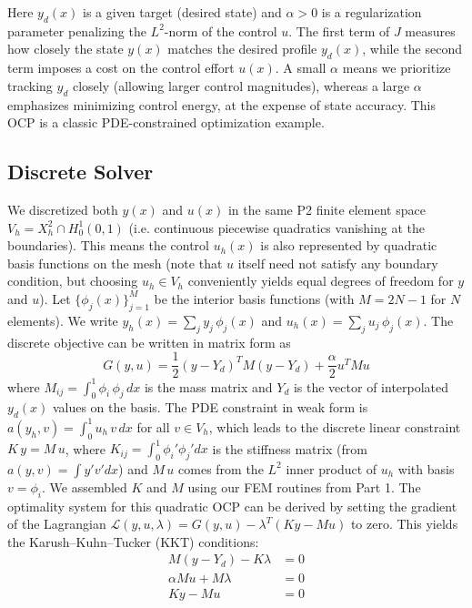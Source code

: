 \documentclass{article}
\begin{document}
Here $y_d(x)$ is a given target (desired state) and $\alpha>0$ is a regularization parameter penalizing the $L^2$-norm of the control $u$. The first term of $J$ measures how closely the state $y(x)$ matches the desired profile $y_d(x)$, while the second term imposes a cost on the control effort $u(x)$. A small $\alpha$ means we prioritize tracking $y_d$ closely (allowing larger control magnitudes), whereas a large $\alpha$ emphasizes minimizing control energy, at the expense of state accuracy. This OCP is a classic PDE-constrained optimization example.

\subsection{Discrete Solver}
We discretized both $y(x)$ and $u(x)$ in the same P2 finite element space $V_h = X_h^2 \cap H_0^1(0,1)$ (i.e. continuous piecewise quadratics vanishing at the boundaries). This means the control $u_h(x)$ is also represented by quadratic basis functions on the mesh (note that $u$ itself need not satisfy any boundary condition, but choosing $u_h\in V_h$ conveniently yields equal degrees of freedom for $y$ and $u$). Let $\{ \phi_j(x)\}_{j=1}^{M}$ be the interior basis functions (with $M=2N-1$ for $N$ elements). We write $y_h(x)=\sum_{j} y_j\,\phi_j(x)$ and $u_h(x)=\sum_{j} u_j\,\phi_j(x)$. The discrete objective can be written in matrix form as 
\begin{equation}
G(y,u) = \frac{1}{2}(y - Y_d)^T M (y - Y_d) + \frac{\alpha}{2}u^T M u
\end{equation}
where $M_{ij}=\int_0^1 \phi_i\,\phi_j\,dx$ is the mass matrix and $Y_d$ is the vector of interpolated $y_d(x)$ values on the basis. The PDE constraint in weak form is $a(y_h,v) = \int_0^1 u_h\,v\,dx$ for all $v\in V_h$, which leads to the discrete linear constraint $K\,y = M\,u$, where $K_{ij}=\int_0^1 \phi_i'\phi_j' dx$ is the stiffness matrix (from $a(y,v)=\int y'v' dx$) and $M\,u$ comes from the $L^2$ inner product of $u_h$ with basis $v=\phi_i$. We assembled $K$ and $M$ using our FEM routines from Part 1. The optimality system for this quadratic OCP can be derived by setting the gradient of the Lagrangian $\mathcal{L}(y,u,\lambda) = G(y,u) - \lambda^T(Ky - Mu)$ to zero. This yields the Karush–Kuhn–Tucker (KKT) conditions:
\begin{align*}
M(y - Y_d) - K\lambda &= 0 \\
\alpha M u + M \lambda &= 0 \\
K y - M u &= 0
\end{align*}
\end{document}
